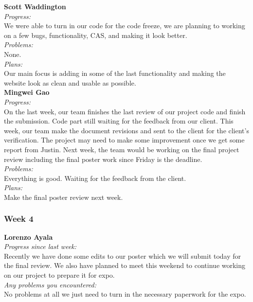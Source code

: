 \noindent\textbf{Scott Waddington}\\
\noindent\textit{Progress:}\\
We were able to turn in our code for the code freeze, we are planning to working on a few bugs, functionality, CAS, and making it look better.\\

\noindent\textit{Problems:}\\
\noindent None.\\

\noindent\textit{Plans:}\\
\noindent Our main focus is adding in some of the last functionality and making the website look as clean and usable as possible.\\

\noindent\textbf{Mingwei Gao}\\
\noindent\textit{Progress:}\\
 On the last week, our team finishes the last review of our project code and finish the submission. Code part still waiting for the feedback from our client. This week, our team make the document revisions and sent to the client for the client's verification. The project may need to make some improvement once we get some report from Justin. Next week, the team would be working on the final project review including the final poster work since Friday is the deadline.\\

\noindent\textit{Problems:}\\
\noindent Everything is good. Waiting for the feedback from the client.\\

\noindent\textit{Plans:}\\
\noindent Make the final poster review next week.\\

\subsubsection{Week 4}

\textbf{Lorenzo Ayala}\\
\noindent\textit{Progress since last week:}\\
Recently we have done some edits to our poster which we will submit today for the final review. We also have planned to meet this weekend to continue working on our project to prepare it for expo. \\

\noindent\textit{Any problems you encountered:}\\
\noindent No problems at all we just need to turn in the necessary paperwork for the expo.\\

